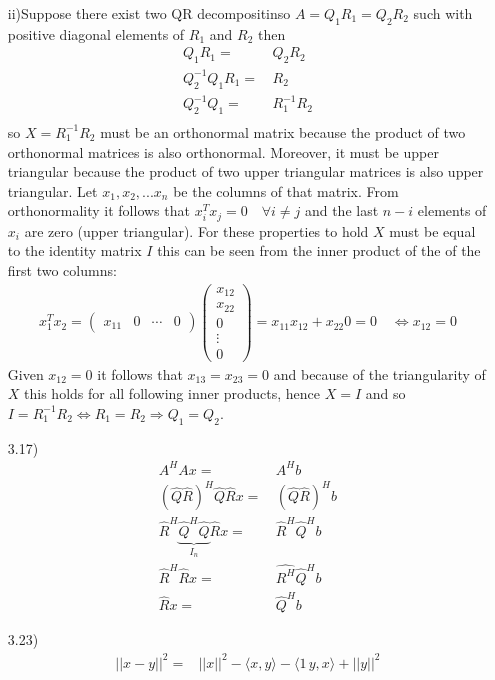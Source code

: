 \documentclass[letterpaper,12pt]{article}
\theoremstyle{definition}
\begin{document}
\begin{enumerate}
ii)Suppose there exist two QR decompositinso $A=Q_1R_1=Q_2R_2$ such with positive diagonal elements of $R_1$ and $R_2$ then 
\begin{align*}
Q_1R_1=&\,Q_2R_2\\
Q_2^{-1}Q_1R_1=&\,R_2\\
Q_2^{-1}Q_1=&\,R_1^{-1}R_2\\
\end{align*}
so $X=R_1^{-1}R_2$ must be an orthonormal matrix because the product of two orthonormal matrices is also orthonormal. Moreover, it must be upper triangular because the product of two upper triangular matrices is also upper triangular. Let $x_1, x_2, ... x_n$ be the columns of that matrix. From orthonormality it follows that $x_i^Tx_j = 0 \quad \forall i\neq j$ and the last $n-i$ elements of $x_i$ are zero (upper triangular). For these properties to hold $X$ must be equal to the identity matrix $I$ this can be seen from the inner product of the of the first two columns:
\begin{align*}
x_1^Tx_{2} = \begin{pmatrix}
x_{11} & 0 &\cdots& 0
\end{pmatrix}
\begin{pmatrix}
x_{12} \\ x_{22} \\ 0 \\\vdots \\ 0
\end{pmatrix}
=x_{11}x_{12} + x_{22}0 =0 \quad \iff x_{12} = 0 
\end{align*}
Given $x_{12} = 0 $ it follows that $x_{13} = x_{23} = 0$ and because of the triangularity of $X$ this holds for all following inner products, hence $X=I$ and so  $I=R_1^{-1}R_2 \Leftrightarrow R_1 = R_2 \Rightarrow Q_1=Q_2$.
\item[3.17)]
\begin{align*}
A^HAx=&\,A^Hb\\
(\hat{Q}\hat{R})^H\hat{Q}\hat{R}x=&\,(\hat{Q}\hat{R})^Hb\\
\hat{R}^H\underbrace{\hat{Q}^H\hat{Q}}_{I_n}\hat{R}x = &\,\hat{R}^H \hat{Q}^H b\\
\hat{R}^H \hat{R}x =&\, \hat{R^H} \hat{Q}^Hb\\
\hat{R}x = &\, \hat{Q}^Hb
\end{align*}
\item[3.23)]
\begin{align*}
||x-y||^2 =& ||x||^2 - \langle x, y \rangle - \langle 1\, y, x\rangle +||y||^2 \\

\end{align*}
\end{enumerate}
\end{document}
